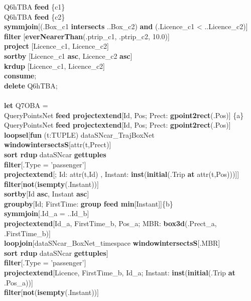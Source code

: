 \documentclass[a4paper]{article}
\newcommand{\op}[1]{\textbf{#1}}
\begin{document}
\begin{scriptsize}
\begin{tabbing}
\>Q6hTBA \op{feed} \{c1\}\\
\>Q6hTBA \op{feed} \{c2\}\\
\>\op{symmjoin}[(.Box\_c1 \op{intersects} ..Box\_c2) \op{and} (.Licence\_c1 < ..Licence\_c2)]\\
\>\op{filter} [\op{everNearerThan}(.ptrip\_c1, .ptrip\_c2, 10.0)]\\
\>\op{project} [Licence\_c1, Licence\_c2]\\
\>\op{sortby} [Licence\_c1 \op{asc}, Licence\_c2 \op{asc}]\\
\>\op{krdup} [Licence\_c1, Licence\_c2]\\
\op{consume};\\
\op{delete} Q6hTBA;\\
\\
\op{let} Q7OBA =\\
\>QueryPointsNet \op{feed projectextend}[Id, Pos; Prect: \op{gpoint2rect}(.Pos)] \{a\}\\
\>QueryPointsNet \op{feed projectextend}[Id, Pos; Prect: \op{gpoint2rect}(.Pos)]\\
\>\>\op{loopsel}[\op{fun} (t:TUPLE) dataSNcar\_TrajBoxNet \op{windowintersectsS}[attr(t,Prect)]\\
\>\>\>\>\op{sort rdup} dataSNcar \op{gettuples}\\
\>\>\>\op{filter}[.Type = 'passenger']\\
\>\>\>\op{projectextend}[; Id: attr(t,Id) , Instant: \op{inst}(\op{initial}(.Trip \op{at} attr(t,Pos)))]]\\
\>\>\>\op{filter}[\op{not}(\op{isempty}(.Instant))]\\
\>\>\>\op{sortby}[Id \op{asc}, Instant \op{asc}]\\
\>\>\>\op{groupby}[Id; FirstTime: \op{group feed min}[Instant]]\{b\}\\
\>\op{symmjoin}[.Id\_a = ..Id\_b]\\
\>\op{projectextend}[Id\_a, FirstTime\_b, Pos\_a; MBR: \op{box3d}(.Prect\_a, .FirstTime\_b)]\\
\>\op{loopjoin}[dataSNcar\_BoxNet\_timespace \op{windowintersectsS}[.MBR]\\
\>\>\>\>\op{sort rdup} dataSNcar \op{gettuples}]\\
\>\op{filter}[.Type = 'passenger']\\
\>\op{projectextend}[Licence, FirstTime\_b, Id\_a; Instant: \op{inst}(\op{initial}(.Trip \op{at} .Pos\_a))]\\
\>\op{filter}[\op{not}(\op{isempty}(.Instant))]\\

\end{tabbing}
\end{scriptsize}
\end{document}
